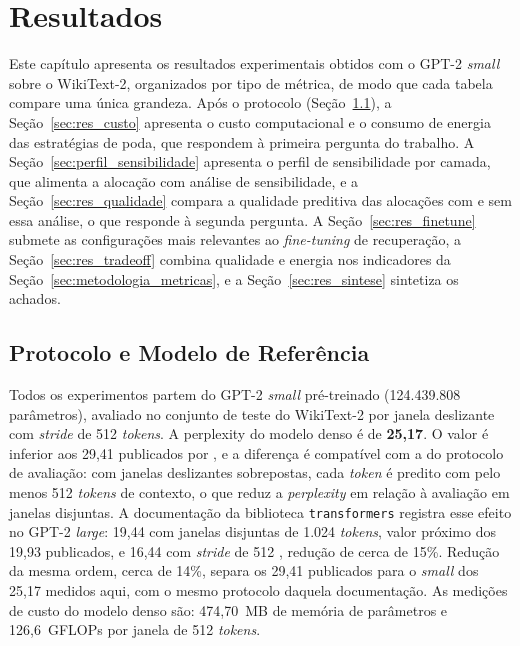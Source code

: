 \chapter{Resultados}\label{chap:resultados}

Este capítulo apresenta os resultados experimentais obtidos com o GPT-2
\textit{small} sobre o WikiText-2, organizados por tipo de métrica, de modo que cada
tabela compare uma única grandeza. Após o protocolo
(Seção~\ref{sec:res_protocolo}), a Seção~\ref{sec:res_custo} apresenta o custo
computacional e o consumo de energia das estratégias de poda, que respondem à primeira
pergunta do trabalho. A Seção~\ref{sec:perfil_sensibilidade} apresenta o perfil de
sensibilidade por camada, que alimenta a alocação com análise de sensibilidade, e a
Seção~\ref{sec:res_qualidade} compara a qualidade preditiva das alocações com e sem essa
análise, o que responde à segunda pergunta. A Seção~\ref{sec:res_finetune} submete as
configurações mais relevantes ao \textit{fine-tuning} de recuperação, a
Seção~\ref{sec:res_tradeoff} combina qualidade e energia nos indicadores da
Seção~\ref{sec:metodologia_metricas}, e a Seção~\ref{sec:res_sintese} sintetiza os
achados.

\section{Protocolo e Modelo de Referência}\label{sec:res_protocolo}

Todos os experimentos partem do GPT-2 \textit{small} pré-treinado
(124.439.808 parâmetros), avaliado no conjunto de teste do WikiText-2 por
janela deslizante com \textit{stride} de 512 \textit{tokens}. A perplexity do
modelo denso é de \textbf{25,17}. O valor é inferior aos 29,41 publicados por
, e a diferença é compatível com a do protocolo de
avaliação: com janelas deslizantes sobrepostas, cada \textit{token} é predito
com pelo menos 512 \textit{tokens} de contexto, o que reduz a
\textit{perplexity} em relação à avaliação em janelas disjuntas. A
documentação da biblioteca \texttt{transformers} registra esse efeito no
GPT-2 \textit{large}: 19,44 com janelas disjuntas de 1.024 \textit{tokens},
valor próximo dos 19,93 publicados, e 16,44 com \textit{stride} de 512
\cite{HuggingFacePerplexity}, redução de cerca de 15\%. Redução da mesma ordem,
cerca de 14\%, separa os 29,41 publicados para o \textit{small} dos 25,17
medidos aqui, com o mesmo protocolo daquela documentação. As medições de custo do modelo denso são: 474,70~MB
de memória de parâmetros e 126,6~GFLOPs por janela de 512 \textit{tokens}.

